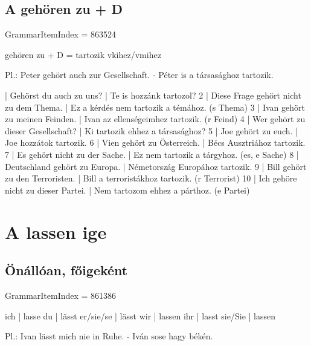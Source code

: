 \documentclass{article}
\newenvironment{desc}{\verbatim}{\endverbatim}
\newenvironment{exmp}{\verbatim}{\endverbatim}
\begin{document}
\subsection{A gehören zu + D}

GrammarItemIndex = 863524

\begin{desc}
gehören zu + D = tartozik vkihez/vmihez

Pl.: Peter gehört auch zur Gesellschaft. - Péter is a társasághoz tartozik.
\end{desc}

\begin{exmp}
1 | Gehörst du auch zu uns? | Te is hozzánk tartozol?
2 | Diese Frage gehört nicht zu dem Thema. | Ez a kérdés nem tartozik a témához. (s Thema)
3 | Ivan gehört zu meinen Feinden. | Ivan az ellenségeimhez tartozik. (r Feind)
4 | Wer gehört zu dieser Gesellschaft? | Ki tartozik ehhez a társasághoz?
5 | Joe gehört zu euch. | Joe hozzátok tartozik.
6 | Vien gehört zu Österreich. | Bécs Ausztriához tartozik.
7 | Es gehört nicht zu der Sache. | Ez nem tartozik a tárgyhoz. (es, e Sache)
8 | Deutschland gehört zu Europa. | Németország Europához tartozik.
9 | Bill gehört zu den Terroristen. | Bill a terroristákhoz tartozik. (r Terrorist)
10 | Ich gehöre nicht zu dieser Partei. | Nem tartozom ehhez a párthoz. (e Partei)
\end{exmp}

\section{A lassen ige}

\subsection{Önállóan, főigeként}

GrammarItemIndex = 861386

\begin{desc}
ich       | lasse
du        | lässt
er/sie/se | lässt
wir       | lassen
ihr       | lasst
sie/Sie   | lassen

Pl.: Ivan lässt mich nie in Ruhe. - Iván sose hagy békén.
\end{desc}
\end{document}
